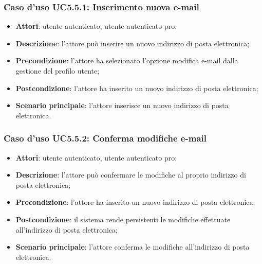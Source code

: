 \subsubsection{Caso d'uso UC5.5.1: Inserimento nuova e-mail}

\begin{itemize}
	\item \textbf{Attori}: utente autenticato, utente autenticato pro;
	\item \textbf{Descrizione}: l'attore può inserire un nuovo indirizzo di posta elettronica;
	\item \textbf{Precondizione}:  l'attore ha selezionato l'opzione modifica e-mail dalla gestione del profilo utente;
	\item \textbf{Postcondizione}: l'attore ha inserito un nuovo indirizzo di posta elettronica;
	\item \textbf{Scenario principale}: l'attore inserisce un nuovo indirizzo di posta elettronica.
\end{itemize}

\subsubsection{Caso d'uso UC5.5.2: Conferma modifiche e-mail}

\begin{itemize}
	\item \textbf{Attori}: utente autenticato, utente autenticato pro;
	\item \textbf{Descrizione}: l'attore può confermare le modifiche al proprio indirizzo di posta elettronica;
	\item \textbf{Precondizione}: l'attore ha inserito un nuovo indirizzo di posta elettronica;
	\item \textbf{Postcondizione}: il sistema rende persistenti le modifiche effettuate all'indirizzo di posta elettronica;
	\item \textbf{Scenario principale}: l'attore conferma le modifiche all'indirizzo di posta elettronica.
\end{itemize}

